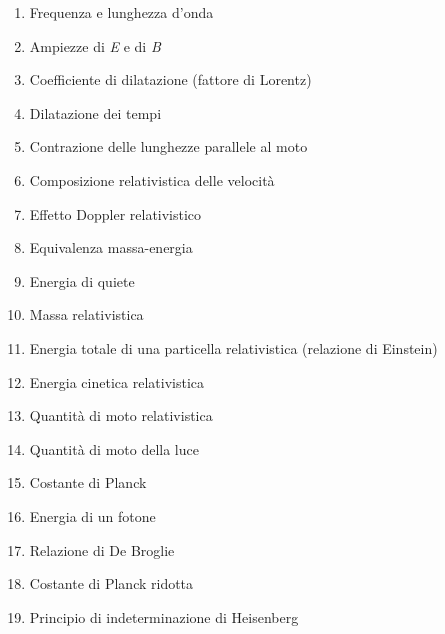 \documentclass[a4paper,11pt,italian]{article}
\begin{document}
\begin{enumerate}
\item Frequenza e lunghezza d'onda 
\item Ampiezze di \textit{E} e di \textit{B}
\item Coefficiente di dilatazione (fattore di Lorentz)
\item Dilatazione dei tempi
\item Contrazione delle lunghezze parallele al moto
\item Composizione relativistica delle velocità
\item Effetto Doppler relativistico
\item Equivalenza massa-energia
\item Energia di quiete
\item Massa relativistica
\item Energia totale di una particella relativistica (relazione di Einstein)
\item Energia cinetica relativistica
\item Quantità di moto relativistica
\item Quantità di moto della luce
\item Costante di Planck
\item Energia di un fotone
\item Relazione di De Broglie
\item Costante di Planck ridotta
\item Principio di indeterminazione di Heisenberg  
\end{enumerate}
\end{document}
